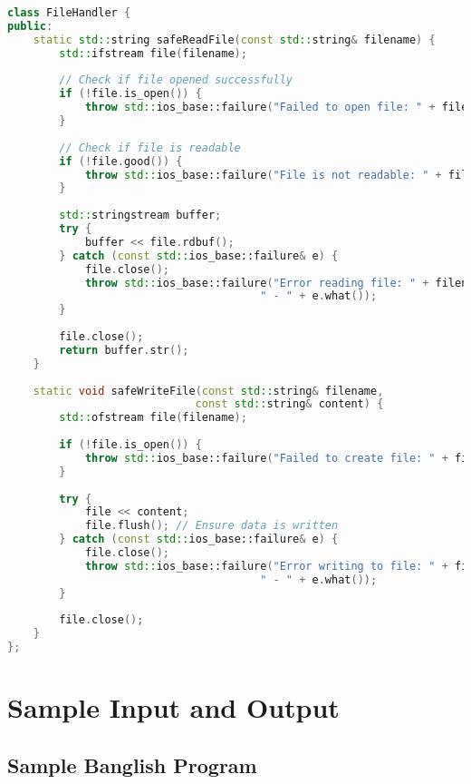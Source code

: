 \documentclass[12pt,a4paper]{article}
\begin{document}
\begin{lstlisting}[language=C++, caption=Robust File Error Handling]
class FileHandler {
public:
    static std::string safeReadFile(const std::string& filename) {
        std::ifstream file(filename);
        
        // Check if file opened successfully
        if (!file.is_open()) {
            throw std::ios_base::failure("Failed to open file: " + filename);
        }
        
        // Check if file is readable
        if (!file.good()) {
            throw std::ios_base::failure("File is not readable: " + filename);
        }
        
        std::stringstream buffer;
        try {
            buffer << file.rdbuf();
        } catch (const std::ios_base::failure& e) {
            file.close();
            throw std::ios_base::failure("Error reading file: " + filename + 
                                       " - " + e.what());
        }
        
        file.close();
        return buffer.str();
    }
    
    static void safeWriteFile(const std::string& filename, 
                             const std::string& content) {
        std::ofstream file(filename);
        
        if (!file.is_open()) {
            throw std::ios_base::failure("Failed to create file: " + filename);
        }
        
        try {
            file << content;
            file.flush(); // Ensure data is written
        } catch (const std::ios_base::failure& e) {
            file.close();
            throw std::ios_base::failure("Error writing to file: " + filename + 
                                       " - " + e.what());
        }
        
        file.close();
    }
};
\end{lstlisting}

\section{Sample Input and Output}

\subsection{Sample Banglish Program}
\end{document}
